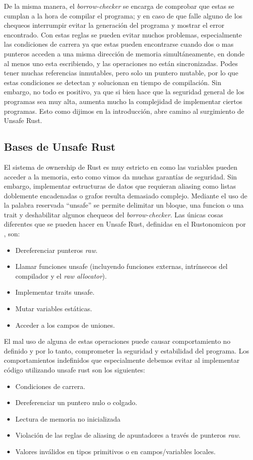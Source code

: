 De la misma manera, el \textit{borrow-checker} se encarga de comprobar que estas se cumplan a la hora de compilar el programa; y en caso de que falle alguno de los chequeos interrumpir evitar la generación del programa y mostrar el error encontrado. Con estas reglas se pueden evitar muchos problemas, especialmente las condiciones de carrera ya que estas pueden encontrarse cuando dos o mas punteros acceden a una misma dirección de memoria simultáneamente, en donde al menos uno esta escribiendo, y las operaciones no están sincronizadas. Podes tener muchas referencias inmutables, pero solo un puntero mutable, por lo que estas condiciones se detectan y solucionan en tiempo de compilación.
Sin embargo, no todo es positivo, ya que si bien hace que la seguridad general de los programas sea muy alta, aumenta mucho la complejidad de implementar ciertos programas. Esto como dijimos en la introducción, abre camino al surgimiento de Unsafe Rust.

\subsection{Bases de Unsafe Rust}

El sistema de ownership de Rust es muy estricto en como las variables pueden acceder a la memoria, esto como vimos da muchas garantías de seguridad. Sin embargo, implementar estructuras de datos que requieran aliasing como listas doblemente encadenadas o grafos resulta demasiado complejo. Mediante el uso de la palabra reservada ``unsafe'' se permite delimitar un bloque, una funcion o una trait y deshabilitar algunos chequeos del \textit{borrow-checker}. Las únicas cosas diferentes que se pueden hacer en Unsafe Rust, definidas en el Rustonomicon por \cite{rustonomicon}, son:
\begin{itemize}[noitemsep]
  \item Dereferenciar punteros \textit{raw}.
  \item Llamar funciones unsafe (incluyendo funciones externas, intrínsecos del compilador y el \textit{raw allocator}).
  \item Implementar traits unsafe.
  \item Mutar variables estáticas.
  \item Acceder a los campos de uniones.
\end{itemize}
El mal uso de alguna de estas operaciones puede causar comportamiento no definido y por lo tanto, comprometer la seguridad y estabilidad del programa. Los comportamientos indefinidos que especialmente debemos evitar al implementar código utilizando unsafe rust son los siguientes:
\begin{itemize}[noitemsep]
  \item Condiciones de carrera.
  \item Dereferenciar un puntero nulo o colgado.
  \item Lectura de memoria no inicializada
  \item Violación de las reglas de aliasing de apuntadores a través de punteros \textit{raw}.
  \item Valores inválidos en tipos primitivos o en campos/variables locales.
\end{itemize}

